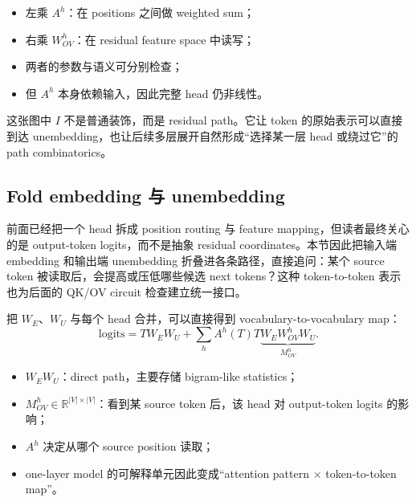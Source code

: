 \begin{itemize}
  \item 左乘 $A^h$：在 positions 之间做 weighted sum；
  \item 右乘 $W_{OV}^h$：在 residual feature space 中读写；
  \item 两者的参数与语义可分别检查；
  \item 但 $A^h$ 本身依赖输入，因此完整 head 仍非线性。
\end{itemize}



这张图中 $I$ 不是普通装饰，而是 residual path。它让 token 的原始表示可以直接到达 unembedding，也让后续多层展开自然形成“选择某一层 head 或绕过它”的 path combinatorics。

\subsection{Fold embedding 与 unembedding}

前面已经把一个 head 拆成 position routing 与 feature mapping，但读者最终关心的是 output-token logits，而不是抽象 residual coordinates。本节因此把输入端 embedding 和输出端 unembedding 折叠进各条路径，直接追问：某个 source token 被读取后，会提高或压低哪些候选 next tokens？这种 token-to-token 表示也为后面的 QK/OV circuit 检查建立统一接口。

把 $W_E$、$W_U$ 与每个 head 合并，可以直接得到 vocabulary-to-vocabulary map：
\[
\mathrm{logits}
=T W_EW_U
+\sum_h A^h(T)
T\underbrace{W_EW_{OV}^hW_U}_{M_{OV}^h}.
\]

\begin{itemize}
  \item $W_EW_U$：direct path，主要存储 bigram-like statistics；
  \item $M_{OV}^h\in\mathbb{R}^{|V|\times |V|}$：看到某 source token 后，该 head 对 output-token logits 的影响；
  \item $A^h$ 决定从哪个 source position 读取；
  \item one-layer model 的可解释单元因此变成“attention pattern × token-to-token map”。
\end{itemize}

